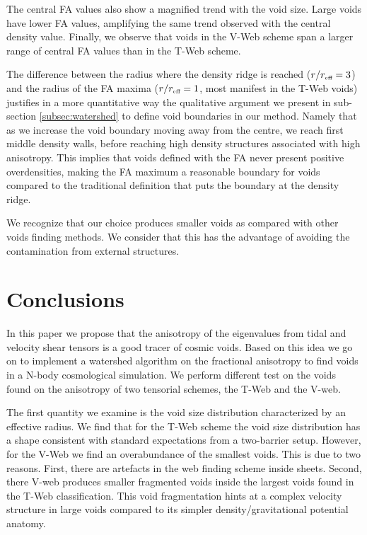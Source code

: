 \documentclass[a4,useAMS,usenatbib,usegraphicx]{mn2e}
\newcommand{\reff}{{\ifmmode{r_{\mbox{\tiny eff}}}\else{$r_{\mbox{\tiny eff}}$}\fi}}
\begin{document}
The central FA values also show a magnified trend with the void size. 
Large voids have lower FA values, amplifying the same trend
observed with the central density value. 
Finally, we observe that voids in the V-Web scheme span a larger range
of central FA values than in the T-Web scheme.  

The difference between the radius where the density ridge is reached 
($r/\reff =3$) and the radius of the FA maxima ($r/\reff =1$, most
manifest in the T-Web voids) justifies in a more quantitative way the
qualitative argument we present in sub-section \ref{subsec:watershed}
to define void boundaries in our method.  
Namely that as we increase the void boundary moving away from the
centre, we reach first middle density walls, before reaching high
density structures associated with high anisotropy.  
This implies that voids defined with the FA never present positive
overdensities, making the FA maximum a reasonable boundary for voids
compared to the traditional definition that puts the boundary at the
density ridge.

We recognize that our choice produces smaller voids as compared with
other voids finding methods. 
We consider that this has the advantage of
avoiding the contamination from external structures.


\section{Conclusions}
\label{sec:conclusions}

In this paper we propose that the anisotropy of the eigenvalues from
tidal and velocity shear tensors is a good tracer of  cosmic voids. 
Based on this idea we go on to implement a watershed
algorithm on the fractional anisotropy to find voids in a N-body
cosmological simulation.
We perform different test on the voids found on the anisotropy of two
tensorial schemes, the T-Web and the V-web.  

The first quantity we examine is the void size distribution
characterized by an effective radius. 
We find that for the T-Web scheme the void size distribution has a
shape consistent with standard expectations from a two-barrier setup. 
However, for the V-Web we find an overabundance of the smallest voids.
This is due to two reasons. 
First, there are artefacts in the web
finding scheme inside sheets. 
Second, there V-web produces smaller
fragmented voids inside the largest voids found in the T-Web
classification.  
This void fragmentation hints at a complex velocity structure in large
voids compared to its simpler density/gravitational potential anatomy.  
\end{document}

